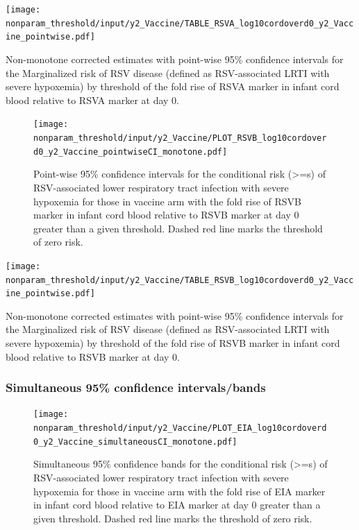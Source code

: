\documentclass[11pt]{article}
\begin{document}
\begin{table}[H]
    \centering
    \texttt{[image: nonparam\_threshold/input/y2\_Vaccine/TABLE\_RSVA\_log10cordoverd0\_y2\_Vaccine\_pointwise.pdf]}
  \caption{Non-monotone corrected estimates with point-wise 95\% confidence intervals for the Marginalized risk of RSV disease (defined as RSV-associated LRTI with severe hypoxemia) by threshold of the fold rise of RSVA marker in infant cord blood relative to RSVA marker at day 0. }
        \label{tab:TABLE_RSVA_log10cordoverd0_y2_Vaccine_pointwise}
\end{table}

\begin{figure}[H]
    \centering
    \texttt{[image: nonparam\_threshold/input/y2\_Vaccine/PLOT\_RSVB\_log10cordoverd0\_y2\_Vaccine\_pointwiseCI\_monotone.pdf]}
   \caption{Point-wise 95\% confidence intervals for the conditional risk (>=s) of RSV-associated lower respiratory tract infection with severe hypoxemia for those in vaccine arm with the fold rise of RSVB marker in infant cord blood relative to RSVB marker at day 0 greater than a given threshold. Dashed red line marks the threshold of zero risk.}
   \label{tab:PLOT_RSVB_log10cordoverd0_y2_Vaccine_pointwise_monotone}
\end{figure}

\begin{table}[H]
    \centering
    \texttt{[image: nonparam\_threshold/input/y2\_Vaccine/TABLE\_RSVB\_log10cordoverd0\_y2\_Vaccine\_pointwise.pdf]}
  \caption{Non-monotone corrected estimates with point-wise 95\% confidence intervals for the Marginalized risk of RSV disease (defined as RSV-associated LRTI with severe hypoxemia) by threshold of the fold rise of RSVB marker in infant cord blood relative to RSVB marker at day 0. }
     \label{tab:TABLE_RSVB_log10cordoverd0_y2_Vaccine_pointwise}
\end{table}

\hypertarget{simultaneous-95-confidence-intervalsbands}{%
\subsubsection{Simultaneous 95\% confidence intervals/bands}\label{simultaneous-95-confidence-intervalsbands}}

\begin{figure}[H]
    \centering
    \texttt{[image: nonparam\_threshold/input/y2\_Vaccine/PLOT\_EIA\_log10cordoverd0\_y2\_Vaccine\_simultaneousCI\_monotone.pdf]}
   \caption{Simultaneous 95\% confidence bands for the conditional risk (>=s) of RSV-associated lower respiratory tract infection with severe hypoxemia for those in vaccine arm with the fold rise of EIA marker in infant cord blood relative to EIA marker at day 0 greater than a given threshold. Dashed red line marks the threshold of zero risk.}
   \label{tab:PLOT_EIA_log10cordoverd0_y2_Vaccine_monotone}
\end{figure}
\end{document}
